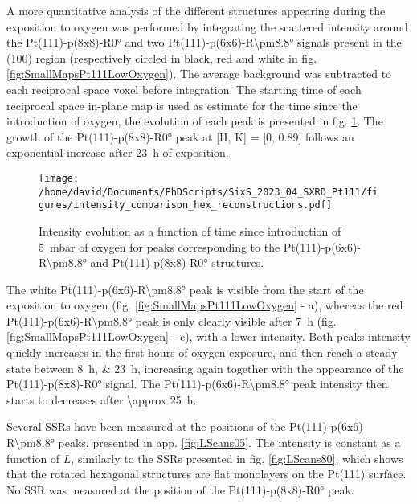 A more quantitative analysis of the different structures appearing during the exposition to oxygen was performed by integrating the scattered intensity around the Pt(111)-p(8x8)-R\ang{0} and two Pt(111)-p(6x6)-R\ang{\pm8.8} signals present in the (100) region (respectively circled in black, red and white in fig. \ref{fig:SmallMapsPt111LowOxygen}).
The average background was subtracted to each reciprocal space voxel before integration.
The starting time of each reciprocal space in-plane map is used as estimate for the time since the introduction of oxygen, the evolution of each peak is presented in fig. \ref{fig:HexBraggPeaks}.
The growth of the Pt(111)-p(8x8)-R\ang{0} peak at [H, K] = [0, 0.89] follows an exponential increase after \qty{23}{\hour} of exposition.

\begin{figure}[!htb]
    \centering
    \texttt{[image: /home/david/Documents/PhDScripts/SixS\_2023\_04\_SXRD\_Pt111/figures/intensity\_comparison\_hex\_reconstructions.pdf]}
    \caption{
        Intensity evolution as a function of time since introduction of \qty{5}{\milli\bar} of oxygen for peaks corresponding to the Pt(111)-p(6x6)-R\ang{\pm8.8} and Pt(111)-p(8x8)-R\ang{0} structures.
    }
    \label{fig:HexBraggPeaks}
\end{figure}

The white Pt(111)-p(6x6)-R\ang{\pm8.8} peak is visible from the start of the exposition to oxygen (fig. \ref{fig:SmallMapsPt111LowOxygen} - a), whereas the red Pt(111)-p(6x6)-R\ang{\pm8.8} peak is only clearly visible after \qty{7}{\hour} (fig. \ref{fig:SmallMapsPt111LowOxygen} - c), with a lower intensity.
Both peaks intensity quickly increases in the first hours of oxygen exposure, and then reach a steady state between \qtylist{8;23}{\hour}, increasing again together with the appearance of the Pt(111)-p(8x8)-R\ang{0} signal.
The Pt(111)-p(6x6)-R\ang{\pm8.8} peak intensity then starts to decreases after \qty{\approx 25}{\hour}.

Several SSRs have been measured at the positions of the Pt(111)-p(6x6)-R\ang{\pm8.8} peaks, presented in app. \ref{fig:LScans05}.
The intensity is constant as a function of $L$, similarly to the SSRs presented in fig. \ref{fig:LScans80}, which shows that the rotated hexagonal structures are flat monolayers on the Pt(111) surface.
No SSR was measured at the position of the Pt(111)-p(8x8)-R\ang{0} peak.

